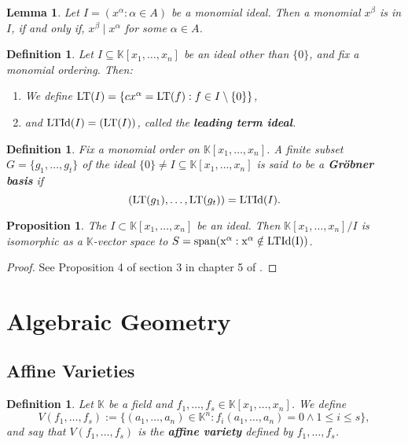 \documentclass[a4paper,12pt]{article}
\newtheorem{definition}[theorem]{Definition}
\newtheorem{lemma}[theorem]{Lemma}
\newtheorem{proposition}[theorem]{Proposition}
\newcommand{\KK}{\mathbb{K}}
\newcommand{\LT }{{\rm LT}}
\newcommand{\LTId }{{\rm LTId}}
\newcommand{\spanset}{\rm span}
\newcommand{\divides}{\mid}
\begin{document}
\begin{lemma}\label{l:mid1}
	Let $I = (x^\alpha : \alpha \in A)$ be a monomial ideal. Then a monomial $x^\beta$ is in $I$, if and only if, $x^\beta \divides x^\alpha$ for some $\alpha \in A$.
\end{lemma}

\begin{definition}
	Let $I \subseteq \KK[x_1, \ldots, x_n]$ be an ideal other than $\{0\}$, and fix a monomial ordering. Then:
	\begin{enumerate}
		\item We define $\LT(I) = \{cx^\alpha = \LT(f): f \in I \setminus \{0\} \}$,
		\item and $\LTId(I) = (\LT(I))$, called the \textbf{leading term ideal}.
	\end{enumerate}
\end{definition}
\begin{definition}
	Fix a monomial order on $\KK[x_1, \ldots, x_n]$. A finite subset $G = \{g_1, \ldots, g_t\}$ of the ideal $\{0\} \neq I \subseteq \KK[x_1, \ldots, x_n]$ is said to be a \textbf{Gr\"obner basis} if $$ (\LT(g_1), \ldots, \LT(g_t)) = \LTId(I).$$
\end{definition}
\begin{proposition}\label{p1:iso}
	The $I \subset \KK[x_1, \ldots, x_n]$ be an ideal. Then $\KK[x_1, \ldots, x_n]/I$ is isomorphic as a $\KK$-vector space to $S = \spanset(x^\alpha : x^\alpha \notin \LTId(I))$.
\end{proposition}
\begin{proof}
	See Proposition 4 of section 3 in chapter 5 of \cite{CoxLittleOshea}.
\end{proof}
\section{Algebraic Geometry}

\subsection{Affine Varieties}
\begin{definition}
	Let $\KK$ be a field and $f_1, \ldots, f_s \in \KK[x_1, \ldots, x_n]$. We define $$
	V(f_1, \ldots, f_s) := \{ (a_1, \ldots, a_n) \in \KK^n : f_i(a_1, \ldots, a_n) = 0 \wedge 1 \leq i \leq s \},
	$$
	and say that $	V(f_1, \ldots, f_s)$ is the \textbf{affine variety} defined by $f_1, \ldots, f_s$.
\end{definition}
\end{document}
